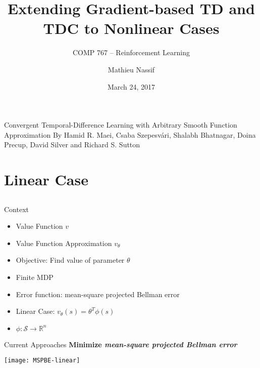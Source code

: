 \documentclass[11pt]{beamer}
\author{Mathieu Nassif}
\title{Extending Gradient-based TD and TDC to Nonlinear Cases}
\subtitle{COMP 767 -- Reinforcement Learning}
\institute{McGill University}
\date{March 24, 2017}
\begin{document}
{
	\begin{frame}
		\titlepage
	\end{frame}
}

\begin{frame}{Convergent Temporal-Difference Learning with Arbitrary Smooth Function Approximation}
	By Hamid R. Maei, Csaba Szepesv\'{a}ri, Shalabh Bhatnagar, Doina Precup, David Silver and Richard S. Sutton
\end{frame}

\section{Linear Case}
\subsection{}

\begin{frame}{Context}
	\begin{itemize}
		\item Value Function $v$
		\item Value Function Approximation $v_\theta$
		\item Objective: Find value of parameter $\theta$
		\vspace{1.5em}
		\pause
		\item Finite MDP
		\item Error function: mean-square projected Bellman error
		\vspace{1.5em}
		\pause
		\item Linear Case: $v_\theta(s) = \theta^T\phi(s)$
		\item $\phi: \mathcal{S} \to \mathbb{R}^n$
	\end{itemize}
\end{frame}

\begin{frame}{Current Approaches}
	\textbf{Minimize \textit{mean-square projected Bellman error}}
	
	\centering
	\texttt{[image: MSPBE-linear]}
\end{frame}
\end{document}
